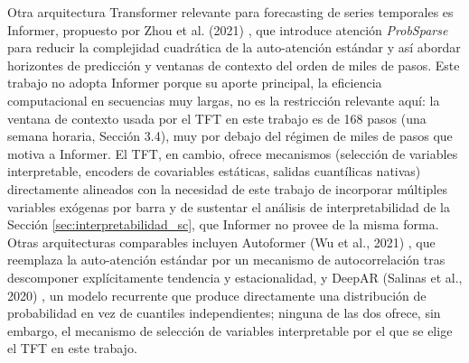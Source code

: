 Otra arquitectura Transformer relevante para forecasting de series temporales es Informer, propuesto por Zhou et al. (2021) \cite{informer}, que introduce atención \textit{ProbSparse} para reducir la complejidad cuadrática de la auto-atención estándar y así abordar horizontes de predicción y ventanas de contexto del orden de miles de pasos. Este trabajo no adopta Informer porque su aporte principal, la eficiencia computacional en secuencias muy largas, no es la restricción relevante aquí: la ventana de contexto usada por el TFT en este trabajo es de 168 pasos (una semana horaria, Sección 3.4), muy por debajo del régimen de miles de pasos que motiva a Informer. El TFT, en cambio, ofrece mecanismos (selección de variables interpretable, encoders de covariables estáticas, salidas cuantílicas nativas) directamente alineados con la necesidad de este trabajo de incorporar múltiples variables exógenas por barra y de sustentar el análisis de interpretabilidad de la Sección \ref{sec:interpretabilidad_sc}, que Informer no provee de la misma forma. Otras arquitecturas comparables incluyen Autoformer (Wu et al., 2021) \cite{AutoformerWu}, que reemplaza la auto-atención estándar por un mecanismo de autocorrelación tras descomponer explícitamente tendencia y estacionalidad, y DeepAR (Salinas et al., 2020) \cite{DeepAR}, un modelo recurrente que produce directamente una distribución de probabilidad en vez de cuantiles independientes; ninguna de las dos ofrece, sin embargo, el mecanismo de selección de variables interpretable por el que se elige el TFT en este trabajo.

